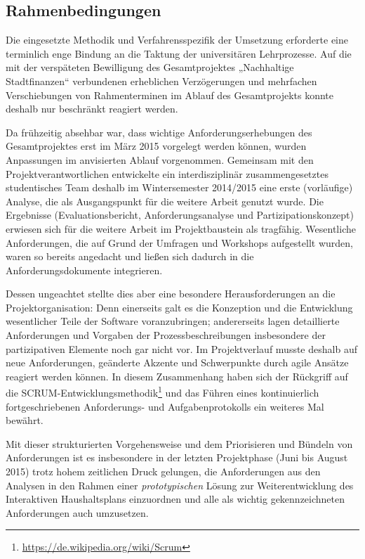 \documentclass[11pt,a4paper,twoside]{article}
\begin{document}
\subsection{Rahmenbedingungen} 

Die eingesetzte Methodik und Verfahrensspezifik der Umsetzung erforderte eine
terminlich enge Bindung an die Taktung der universitären Lehrprozesse.  Auf
die mit der verspäteten Bewilligung des Gesamtprojektes „Nachhaltige
Stadtfinanzen“ verbundenen erheblichen Verzögerungen und mehrfachen
Verschiebungen von Rahmenterminen im Ablauf des Gesamtprojekts konnte deshalb
nur beschränkt reagiert werden. 

Da frühzeitig absehbar war, dass wichtige Anforderungserhebungen des
Gesamtprojektes erst im März 2015 vorgelegt werden können, wurden Anpassungen
im anvisierten Ablauf vorgenommen. Gemeinsam mit den Projektverantwortlichen
entwickelte ein interdisziplinär zusammengesetztes studentisches Team deshalb
im Wintersemester 2014/2015 eine erste (vorläufige) Analyse, die als
Ausgangspunkt für die weitere Arbeit genutzt wurde. Die Ergebnisse
(Evaluationsbericht, Anforderungsanalyse und Partizipationskonzept) erwiesen
sich für die weitere Arbeit im Projektbaustein als tragfähig. Wesentliche
Anforderungen, die auf Grund der Umfragen und Workshops aufgestellt wurden,
waren so bereits angedacht und ließen sich dadurch in die
Anforderungsdokumente integrieren.

Dessen ungeachtet stellte dies aber eine besondere Herausforderungen an die
Projektorganisation: Denn einerseits galt es die Konzeption und die Entwicklung
wesentlicher Teile der Software voranzubringen; andererseits lagen detaillierte
Anforderungen und Vorgaben der Prozessbeschreibungen insbesondere der
partizipativen Elemente noch gar nicht vor. Im Projektverlauf musste deshalb
auf neue Anforderungen, geänderte Akzente und Schwerpunkte durch agile Ansätze
reagiert werden können. In diesem Zusammenhang haben sich der Rückgriff auf die
SCRUM-Entwicklungsmethodik\footnote{\url{https://de.wikipedia.org/wiki/Scrum}}
und das Führen eines kontinuierlich fortgeschriebenen Anforderungs- und
Aufgabenprotokolls ein weiteres Mal bewährt.

Mit dieser strukturierten Vorgehensweise und dem Priorisieren und Bündeln von
Anforderungen ist es insbesondere in der letzten Projektphase (Juni bis August
2015) trotz hohem zeitlichen Druck gelungen, die Anforderungen aus den
Analysen in den Rahmen einer \emph{prototypischen} Lösung zur
Weiterentwicklung des Interaktiven Haushaltsplans einzuordnen und alle als
wichtig gekennzeichneten Anforderungen auch umzusetzen.
\end{document}
